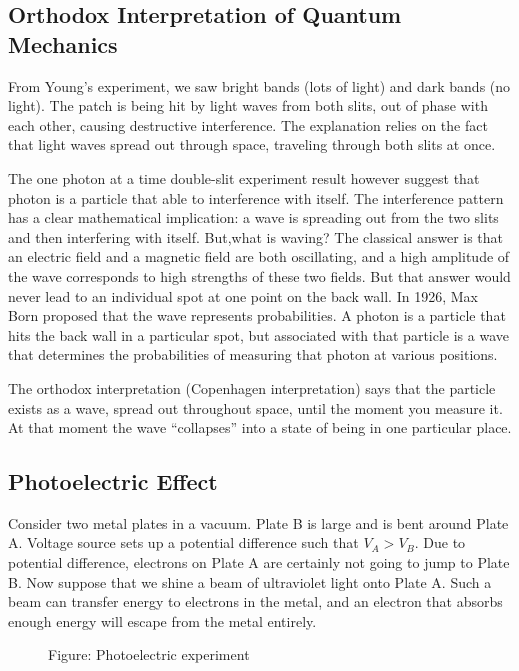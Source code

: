 \documentclass[../../../main.tex]{subfiles}
\begin{document}
\subsection{Orthodox Interpretation of Quantum Mechanics}
From Young's experiment, we saw bright bands (lots of light) and dark bands (no light). The patch is being hit by light waves from both slits, out of phase with each other, causing destructive interference. The explanation relies on the fact that light waves spread out through space, traveling through both slits at once. 

The one photon at a time double-slit experiment result however suggest that photon is a particle that able to interference with itself. The interference pattern has a clear mathematical implication: a wave is spreading out from the two slits and then interfering with itself. But,what is waving? The classical answer is that an electric field and a magnetic field are both oscillating, and a high amplitude of the wave corresponds to high strengths of these two fields. But that answer would never lead to an individual spot at one point on the back wall. In 1926, Max Born proposed that the wave represents probabilities. A photon is a particle that hits the back wall in a particular spot, but associated with that particle is a wave that determines the probabilities of measuring that photon at various positions. 

The orthodox interpretation (Copenhagen interpretation) says that the particle exists as a wave, spread out throughout space, until the moment you measure it. At that moment the wave “collapses” into a state of being in one particular place. 

\subsection{Photoelectric Effect}
Consider two metal plates in a vacuum. Plate B is large and is bent around Plate A. Voltage source sets up a potential difference such that $V_A > V_B$. Due to potential difference, electrons on Plate A are certainly not going to jump to Plate B. Now suppose that we shine a beam of ultraviolet light onto Plate A. Such a beam can transfer energy to electrons in the metal, and an electron that absorbs enough energy will escape from the metal entirely. 

\begin{figure}[b]
    \centering
    \caption*{Figure: Photoelectric experiment}
\end{figure}
\end{document}
